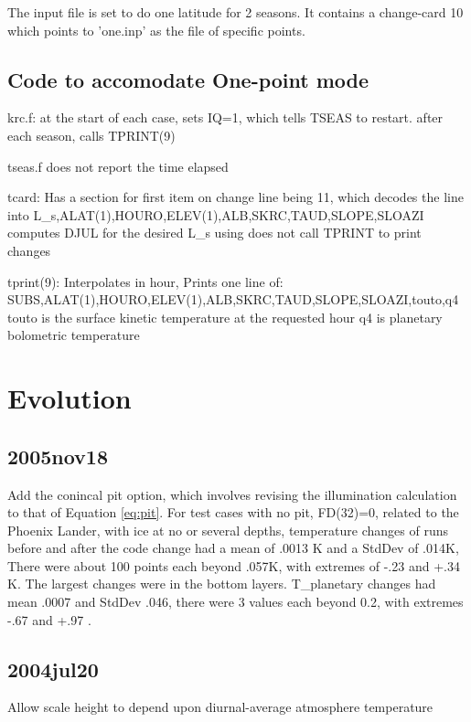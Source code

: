 \documentclass{article}
\begin{document}
The input file  is set to do one latitude for 2 seasons.
It contains a change-card 10 which points to 'one.inp' as the file of specific
points.

\subsection{Code to accomodate One-point mode} %
krc.f: 
\qi at the start of each case, sets IQ=1, which tells TSEAS to restart.
\qi after each season, calls TPRINT(9)

tseas.f
\qi does not report the time elapsed

tcard:
\qi Has a section for first item on change line being 11, which decodes the line into
\qii L\_s,ALAT(1),HOURO,ELEV(1),ALB,SKRC,TAUD,SLOPE,SLOAZI
\qii computes DJUL for the desired L\_s using 
\qi does not call TPRINT to print changes

tprint(9):
\qi Interpolates in hour,  Prints one line of: 
\qii SUBS,ALAT(1),HOURO,ELEV(1),ALB,SKRC,TAUD,SLOPE,SLOAZI,touto,q4
\qiii touto is the surface kinetic temperature at the requested hour
\qiii q4 is planetary bolometric temperature

\section{Evolution} %
\subsection{2005nov18} %
Add the conincal pit option, which involves revising the illumination
calculation to that of Equation \ref{eq:pit}. For test cases with no pit,
FD(32)=0, related to the Phoenix Lander, with ice at no or several depths,
temperature changes of runs before and after the code change had a mean of .0013
K and a StdDev of .014K, There were about 100 points each beyond .057K, with
extremes of -.23 and +.34 K. The largest changes were in the bottom layers.
T\_planetary changes had mean .0007 and StdDev .046, there were 3 values each
beyond 0.2, with extremes -.67 and +.97 .
\subsection{2004jul20} %
Allow scale height to depend upon diurnal-average atmosphere temperature
\end{document}
